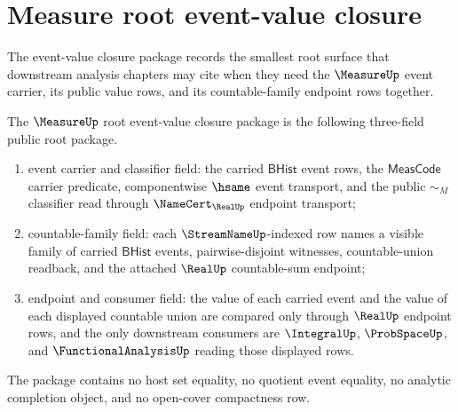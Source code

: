 \section{Measure root event-value closure}
\label{sec:measure-root-unblock-event-value-closure}

The event-value closure package records the smallest root surface that
downstream analysis chapters may cite when they need the $\MeasureUp$ event
carrier, its public value rows, and its countable-family endpoint rows
together.

\begin{definition}
\label{def:measure-root-unblock-event-value-closure}
The $\MeasureUp$ root event-value closure package is the following
three-field public root package.
\begin{enumerate}
  \item event carrier and classifier field: the carried $\mathsf{BHist}$
  event rows, the $\mathsf{MeasCode}$ carrier predicate, componentwise
  $\hsame$ event transport, and the public $\sim_M$ classifier read through
  $\NameCert_{\RealUp}$ endpoint transport;
  \item countable-family field: each $\StreamNameUp$-indexed row names a
  visible family of carried $\mathsf{BHist}$ events, pairwise-disjoint
  witnesses, countable-union readback, and the attached $\RealUp$
  countable-sum endpoint;
  \item endpoint and consumer field: the value of each carried event and the
  value of each displayed countable union are compared only through
  $\RealUp$ endpoint rows, and the only downstream consumers are
  $\IntegralUp$, $\ProbSpaceUp$, and $\FunctionalAnalysisUp$ reading those
  displayed rows.
\end{enumerate}
The package contains no host set equality, no quotient event equality, no
analytic completion object, and no open-cover compactness row.
\end{definition}

